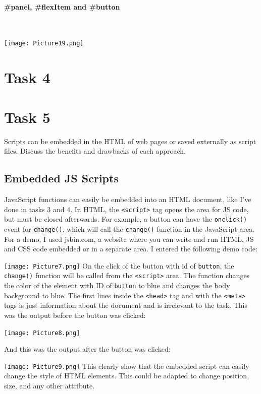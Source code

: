 \documentclass[a4paper]{article}
\begin{document}
\paragraph{\#panel, \#flexItem and \#button}
~\par
\noindent\texttt{[image: Picture19.png]}
\newpage
\section{Task 4}

\newpage
\section{Task 5}
Scripts can be embedded in the HTML of web pages or saved externally as script files. Discuss the benefits and drawbacks of each approach.
\subsection{Embedded JS Scripts}
JavaScript functions can easily be embedded into an HTML document, like I've done in tasks 3 and 4. In HTML, the \verb|<script>| tag opens the area for JS code, but must be closed afterwards. For example, a button can have the \verb|onclick()| event for \verb|change()|, which will call the \verb|change()| function in the JavaScript area. For a demo, I used jsbin.com, a website where you can write and run HTML, JS and CSS code embedded or in a separate area. I entered the following demo code: \par
\noindent\texttt{[image: Picture7.png]}
On the click of the button with id of \verb|button|, the \verb|change()| function will be called from the \verb|<script>| area. The function changes the color of the element with ID of \verb|button| to blue and changes the body background to blue. The first lines inside the \verb|<head>| tag and with the \verb|<meta>| tags is just information about the document and is irrelevant to the task. This was the output before the button was clicked: \par
\noindent\texttt{[image: Picture8.png]}\par \newpage
And this was the output after the button was clicked: \par
\noindent\texttt{[image: Picture9.png]}
This clearly show that the embedded script can easily change the style of HTML elements. This could be adapted to change position, size, and any other attribute. \newpage
\end{document}
